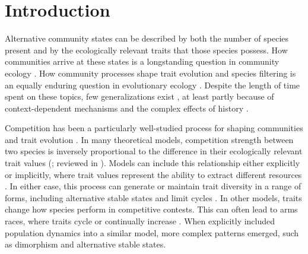 
\section*{Introduction}

Alternative community states can be described by both the number of species present and by the
ecologically relevant traits that those species possess. How communities arrive at these states
is a longstanding question in community ecology
\citep{Drake:1991bv,Weiher:1999tf,Gleason:1927cj,Clements:1936hw}. 
How community processes shape trait evolution and species filtering is an equally enduring
question in evolutionary ecology
\citep{Darwin:1859to,Loeuille:2018cx,Pontarp:2018hv,MacArthur:1964uv,Schluter:2000jz,Muschick:2012ha}.
Despite the length of time spent on these topics, few generalizations exist \citep{Lawton:1999fj}, at 
least partly because of context-dependent mechanisms \citep{Drake:1991bv} and the complex effects of 
history \citep{Drake:1991bv,Chase:2003ko,Weiher:1999tf}.

Competition has been a particularly well-studied process for shaping communities and trait evolution 
\citep{Simpson:1953wr,Volterra:1928fy,Macarthur:1964kv,Hardin:1960ep,Roughgarden:1976eh,Rosenzweig:1978bj,
Armstrong:1980id,Hutchinson:1959tq,BrownJr:1956wi,Day:2004db}. 
In many theoretical models, competition strength between two species is inversely proportional to 
the difference in their ecologically relevant trait values
(\citealp{Abrams:1983jz,Macarthur:1967jf,Volterra:1928fy,Macarthur:1964kv,Rosenzweig:1978bj}; 
reviewed in \citealp{Taper:1992kz,Taper:1985ub,Abrams:1986tx,Dayan:2005ub}). 
Models can include this relationship either explicitly \citep[e.g.,][]{Burger:2006tq,Roughgarden:1976eh,Zu:2008uw} 
or implicitly, where trait values represent the ability to extract different resources 
\citep[e.g.,][]{Macarthur:1964kv,Ackermann:2004bb}. In either case, this process can generate or maintain 
trait diversity in a range of forms, including alternative stable states and limit cycles 
\citep{Gilpin:1975gz,Burger:2006tq}. 
In other models, traits change how species perform in competitive contests. 
This can often lead to arms races, where traits cycle or continually increase 
\citep{MaynardSmith:1986tw,Parker:1983io}. 
When \citet{Abrams:1994th} explicitly included population dynamics into a similar model, more complex 
patterns emerged, such as dimorphism and alternative stable states.

